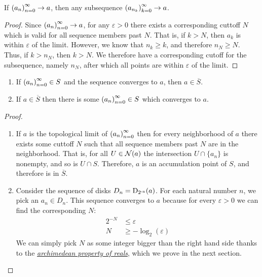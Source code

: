 \begin{theorem}
If $\seq{a} \to a$, then any subsequence $\seq{a}[n_k][k] \to a$.
\end{theorem}
\begin{proof}
Since $\seq{a} \to a$, for any $\varepsilon > 0$ there exists a corresponding cuttoff $N$ which is valid for all sequence members past $N$. That is, if $k > N$, then $a_k$ is within $\varepsilon$ of the limit. However, we know that $n_k \geq k$, and therefore $n_N \geq N$. Thus, if $k > n_N$, then $k > N$. We therefore have a corresponding cutoff for the subsequence, namely $n_N$, after which all points are within $\varepsilon$ of the limit.
\end{proof}
\begin{theorem}
\begin{enumerate}
\item If $\seq{a} \in S$ and the sequence converges to $a$, then $a \in \overline{S}$.
\item If $a \in \overline{S}$ then there is some $\seq{a} \in S$ which converges to $a$.
\end{enumerate}
\end{theorem}
\begin{proof}
\begin{enumerate}
\item If $a$ is the topological limit of $\seq{a}$ then for every neighborhood of $a$ there exists some cuttoff $N$ such that all sequence members past $N$ are in the neighborhood. That is, for all $U \in \nbhd{a}$ the intersection $U \cap \{a_n\}$ is nonempty, and so is $U \cap S$. Therefore, $a$ is an accumulation point of $S$, and therefore is in $\overline{S}$.
\item Consider the sequence of disks $D_n = \disk{a}{2^{-n}}$. For each natural number $n$, we pick an $a_n \in D_n$. This sequence converges to $a$ because for every $\varepsilon > 0$ we can find the corresponding $N$:
\begin{align*}
2^{-N} &\leq \varepsilon\\
N &\geq -\log_2 (\varepsilon) 
\end{align*}
We can simply pick $N$ as some integer bigger than the right hand side thanks to the \hyperlink{Archimedean Property}{\emph{archimedean property of reals}}, which we prove in the next section.
\end{enumerate}
\end{proof}
